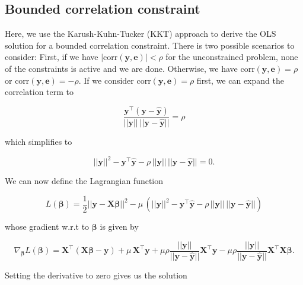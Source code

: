 \documentclass[utf8]{frontiersSCNS} %
\renewcommand{\b}{\boldsymbol{\beta}} %
\newcommand{\bh}{\boldsymbol{\hat{\beta}}} %
\newcommand{\corr}{\text{corr}}
\newcommand{\e}{\mathbf{e}}
\newcommand{\X}{\mathbf{X}}
\newcommand{\y}{\mathbf{y}}
\newcommand{\yh}{\mathbf{\hat{y}}}
\newcommand{\yt}{\mathbf{\widetilde{y}}}
\begin{document}






\subsection{Bounded correlation  constraint}\label{app:solution_limited_correlation}

Here, we use the Karush-Kuhn-Tucker (KKT) approach to derive the OLS solution for a bounded correlation constraint. There is two possible scenarios to consider: First, if we have $|\corr(\y,\e)|<\rho$ for the unconstrained problem, none of the constraints is active and we are done. Otherwise, we have $\corr(\y,\e)=\rho$ or $\corr(\y,\e)=-\rho$. If we consider $\corr(\y,\e)=\rho$ first, we can expand the correlation term to


\begin{equation}\label{eq:corr_expanded}
\frac{\y^\top(\y-\yh)}{||\y||\ ||\y-\yh||} = \rho
\end{equation}

which simplifies to

\begin{equation}\label{eq:simplified_correlation}
||\y||^2-\y^\top\yh - \rho\, ||\y||\,||\y-\yh|| = 0.
\end{equation}

We can now define the Lagrangian function

\[
L(\b) = \frac{1}{2}||\y - \X\b||^2 - \mu\,(||\y||^2-\y^\top\yh - \rho\, ||\y||\,||\y-\yh||)
\]

whose gradient w.r.t to $\b$ is given by

\[
\nabla_{\b} L(\b) = \X^\top(\X\b-\y) + \mu\,\X^\top\y + \mu\rho \frac{||\y||}{||\y-\yh||}\X^\top\y -\mu\rho \frac{||\y||}{||\y-\yh||} \X^\top\X\b.
\]


Setting the derivative to zero gives us the solution
\end{document}
